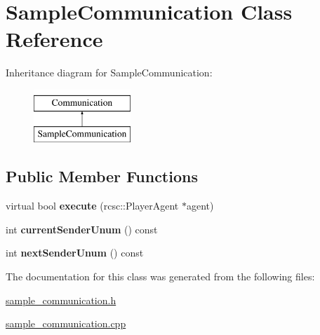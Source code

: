 \hypertarget{classSampleCommunication}{
\section{SampleCommunication Class Reference}
\label{classSampleCommunication}
}
Inheritance diagram for SampleCommunication:\begin{figure}[H]
\begin{center}
\leavevmode
\includegraphics[height=2.000000cm]{classSampleCommunication}
\end{center}
\end{figure}
\subsection*{Public Member Functions}
\begin{DoxyCompactItemize}
\item 
\hypertarget{classSampleCommunication_a9aad3f7ea92303fd9f9e6d336a0db183}{
virtual bool {\bfseries execute} (rcsc::PlayerAgent $\ast$agent)}
\label{classSampleCommunication_a9aad3f7ea92303fd9f9e6d336a0db183}

\item 
\hypertarget{classSampleCommunication_ae73e460b66064271829f689c8cc70485}{
int {\bfseries currentSenderUnum} () const }
\label{classSampleCommunication_ae73e460b66064271829f689c8cc70485}

\item 
\hypertarget{classSampleCommunication_ab62036bb88662dd1e9b0909e67562ec9}{
int {\bfseries nextSenderUnum} () const }
\label{classSampleCommunication_ab62036bb88662dd1e9b0909e67562ec9}

\end{DoxyCompactItemize}


The documentation for this class was generated from the following files:\begin{DoxyCompactItemize}
\item 
\hyperlink{sample__communication_8h}{sample\_\-communication.h}\item 
\hyperlink{sample__communication_8cpp}{sample\_\-communication.cpp}\end{DoxyCompactItemize}
